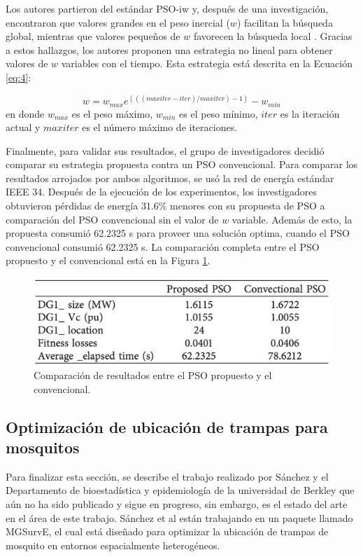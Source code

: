 \documentclass[letterpaper]{report}
\begin{document}
    Los autores partieron del estándar PSO-iw y, después de una investigación,
    encontraron que valores grandes en el peso inercial ($w$) facilitan la
    búsqueda global, mientras que valores pequeños de $w$ favorecen la búsqueda
    local \cite{CPSO, APSO2016}. Gracias a estos hallazgos, los autores proponen
    una estrategia no
    lineal para obtener valores de $w$ variables con el tiempo. Esta estrategia
    está descrita en la Ecuación \ref{eq:4}:

    \begin{equation}
      \label{eq:4}
      w = w_{max} e^{(((maxiter - iter) / maxiter) - 1)} - w_{min} 
    \end{equation}
    en donde $w_{max}$ es el peso máximo, $w_{min}$ es el peso mínimo, $iter$ es
    la iteración actual y $maxiter$ es el número máximo de iteraciones.

    Finalmente, para validar sus resultados, el grupo de investigadores
    decidió comparar su
    estrategia propuesta contra un PSO convencional. Para comparar los
    resultados arrojados por ambos algoritmos, se usó la red de energía estándar
    IEEE 34. Después de la ejecución de los experimentos, los investigadores
    obtuvieron pérdidas de energía 31.6\% menores con su propuesta de PSO a
    comparación del PSO convencional sin el valor de $w$ variable. Además de
    esto, la propuesta consumió 62.2325 s para proveer una solución optima,
    cuando el PSO convencional consumió 62.2325 s. La comparación completa
    entre el PSO propuesto y el convencional está en la Figura
    \ref{fig:pso-iw-variable-comp}.

    \begin{figure}[ht!]
      \includegraphics[width=\textwidth]{pso-iw-variable-comp.png}
      \centering
      \caption{Comparación de resultados entre el PSO propuesto y el
        convencional.}
      \label{fig:pso-iw-variable-comp}
      \centering
    \end{figure}

  \subsection{Optimización de ubicación de trampas para mosquitos}
    \label{subsection:mgsurve}
    Para finalizar esta sección, se describe el
    trabajo realizado por Sánchez y el Departamento de bioestadística y
    epidemiología de la universidad de Berkley \cite{MGSurvE} que aún no ha sido
    publicado y sigue en progreso, sin embargo, es el estado del arte en el área
    de este trabajo. Sánchez et al están trabajando en un paquete llamado
    MGSurvE, el cual está diseñado para optimizar la ubicación de trampas de
    mosquito en entornos espacialmente heterogéneos. 
\end{document}

